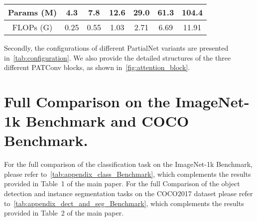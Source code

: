 \begin{table*}[ht]
{\begin{tabular}{@{}c|c|c|c|c|c|c|c|c|c@{}}
      \hline
      \multicolumn{4}{c|}{Params (M)} & 4.3                                        & 7.8                                                                                                                                                                                        & 12.6             & 29.0 & 61.3 & 104.4                      \\
      \hline
      \multicolumn{4}{c|}{FLOPs (G)}  & 0.25                                       & 0.55                                                                                                                                                                                       & 1.03             & 2.71 & 6.69 & 11.91                       \\
      \bottomrule
    \end{tabular}%
  }
  \caption{Configurations of different PartialNet variants. 'Conv\_$k$\_$c$\_$s$' refers to a convolutional layer with a kernel size of $k$, output channels of $c$, and a stride of $s$. 'PAT\_ch$\_k\_c\_s\_r$' refers to a partial attention convolution with an additional parameter, the split ratio $r$ of feature map channels, compared to a regular convolution. Similarly, 'PAT\_sp$\_k\_c\_s\_r$' and 'PAT\_sf$\_k\_c\_s\_r$' have the same configuration. Additionally, 'FC\_1000' refers to a fully connected layer with 1000 output channels. The $h \times w$ represents the input size, while $b\_i$ denotes the number of PartialNet blocks at stage $i$. FLOPs are calculated for an input size of $224 \times 224$.}
  \label{tab:configuration}
\end{table*}

Secondly, the configurations of different PartialNet variants are presented in~\cref{tab:configuration}. We also provide the detailed structures of the three different PATConv blocks, as shown in~\cref{fig:attention_block}.

\section{Full Comparison on the ImageNet-1k Benchmark and COCO Benchmark.}
For the full comparison of the classification task on the ImageNet-1k Benchmark, please refer to~\cref{tab:appendix_class_Benchmark}, which complements the results provided in Table~1 of the main paper. For the full Comparison of the object detection and instance segmentation tasks on the COCO2017 dataset please refer to~\cref{tab:appendix_dect_and_seg_Benchmark}, which complements the results provided in Table~2 of the main paper. 

